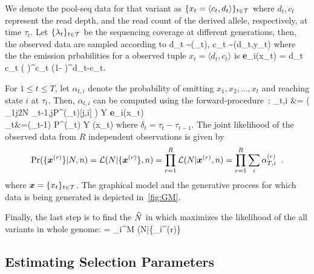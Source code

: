 We denote the pool-seq data for that variant as $\{x_t =
\langle c_t,d_t \rangle\}_{t\in{\cal T}}$ where $d_t, c_t$ represent the read depth,
and the read count of the derived allele, respectively, at time
$\tau_t$. Let $\{\lambda_t\}_{t\in{\cal T}}$ be the sequencing coverage at different 
generations, then, the observed data are sampled according to 
\beq
d_t \sim \poiss(\lambda_t), \hspace{1in} c_t \sim \bino(d_t,y_t)
\eeq
where the the emission prbabilities for a observed tuple  $x_t=\langle d_t, 
c_t\rangle $ is
\beq
	{\bf e}_{i}(x_t) = {d_t \choose c_t} \left( \right)^{c_t}\left 
	(1- 
	 \right)^{d_t-c_t}.
\eeq
{}


For $1\le t\le T$, let $\alpha_{t,i}$ denote the probability of
emitting $x_1,x_2,\ldots,x_t$ and reaching state $i$ at
$\tau_t$. Then, $\alpha_{t,i}$ can be computed using the
forward-procedure~\cite{durbin1998biological}:
\beq
	\alpha_{t,i} &= \left( \sum_{1\le j\le 2N} 
	\alpha_{t-1,j}\;P^{(\delta_t)}[j,i] \right) Y {\bf 
	e}_{i}(x_t)\;\; \\
	\alpha_t&=(\alpha_{t-1}) P^{(\delta_t)} Y \bfe(x_t)
	\label{eq:hmm}
\eeq
where $\delta_t=\tau_t-\tau_{t-1}$. The joint likelihood of the
observed data from $R$ independent observations is given by
\begin{equation}
\operatorname{Pr}(\{\bm{x}^{(r)}\}|N,n) =	{\cal L}(N|\{\bm{x}^{(r)}\}, 
n)=\prod_{r=1}^R{\cal L}(N|\bm{x}^{(r)},n)
	 = 
	\prod_{r=1}^R \sum_i\alpha_{T,i}^{(r)}\;\;.
	\label{eq:hmmlik}
\end{equation}
where $\bm{x}=\{x_t\}_{t\in {\cal T}}$. The graphical model and the generative 
process for which data is being generated is depicted in~\ref{fig:GM}.

Finally, the last step is to find the  $\widehat{N}$ in which maximizes the likelihood of 
the all variants in whole genome:
\beq
\hN =  \prod_i^M \Lc(N|\{_i^{(r)}\} 
\label{eq:mlen}
\eeq

\subsection{Estimating Selection Parameters}

